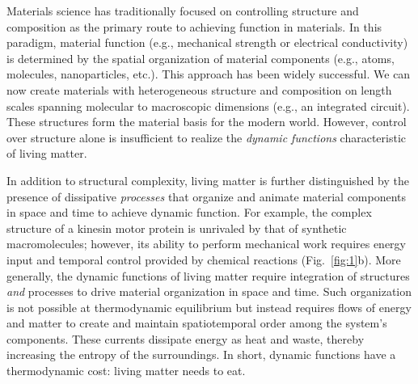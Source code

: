 \begin{appendices}
Materials science has traditionally focused on controlling structure and composition as the primary route to achieving function in materials. In this paradigm, material function (e.g., mechanical strength or electrical conductivity) is determined by the spatial organization of material components (e.g., atoms, molecules, nanoparticles, etc.). This approach has been widely successful. We can now create materials with heterogeneous structure and composition on length scales spanning molecular to macroscopic dimensions (e.g., an integrated circuit).  These structures form the material basis for the modern world. However, control over structure alone is insufficient to realize the \emph{dynamic functions} characteristic of living matter.

In addition to structural complexity, living matter is further distinguished by the presence of dissipative \emph{processes} that organize and animate material components in space and time to achieve dynamic function. For example, the complex structure of a kinesin motor protein is unrivaled by that of synthetic macromolecules; however, its ability to perform mechanical work requires energy input and temporal control provided by chemical reactions (Fig.~\ref{fig:1}b). More generally, the dynamic functions of living matter require integration of structures \emph{and} processes to drive material organization in space and time.  Such organization is not possible at thermodynamic equilibrium but instead requires flows of energy and matter to create and maintain spatiotemporal order among the system's components.  These currents dissipate energy as heat and waste, thereby increasing the entropy of the surroundings.  In short, dynamic functions have a thermodynamic cost: living matter needs to eat. 


\end{appendices}
